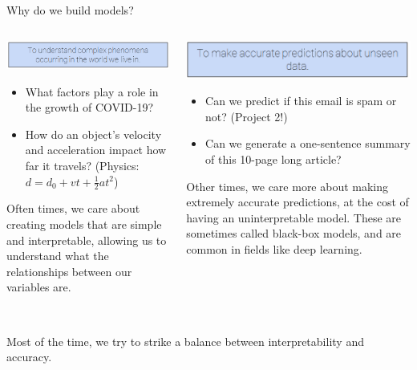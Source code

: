 \documentclass[aspectratio=169]{../latex_main/tntbeamer}  %
\begin{document}
	\begin{frame}{Why do we build models?}
	    \begin{columns}
	        \begin{column}{.5\textwidth}
	                \includegraphics[scale=.4]{Bild4}
	                \begin{itemize}
	                    \item What factors play a role in the growth of COVID-19?
	                    \item How do an object’s velocity and acceleration impact how far it travels? (Physics: $d = d_0+vt+\frac{1}{2}at^2$)
	                \end{itemize}
	                Often times, we care about creating models that are simple and interpretable, allowing us to understand what the relationships between our variables are.
	                
	        \end{column}
	        
	        
	        \begin{column}{.5\textwidth}
	                    \includegraphics[scale=.4]{Bild5}
                    \begin{itemize}
	                    \item Can we predict if this email is spam or not? (Project 2!)
	                    \item Can we generate a one-sentence summary of this 10-page long article?  
	                \end{itemize}
	                Other times, we care more about making extremely accurate predictions, at the cost of having an uninterpretable model. These are sometimes called black-box models, and are common in fields like deep learning.
	        \end{column}
	    \end{columns}
	    \\\bigskip
	    Most of the time, we try to strike a balance between interpretability and accuracy.

	\end{frame}
	
\end{document}

